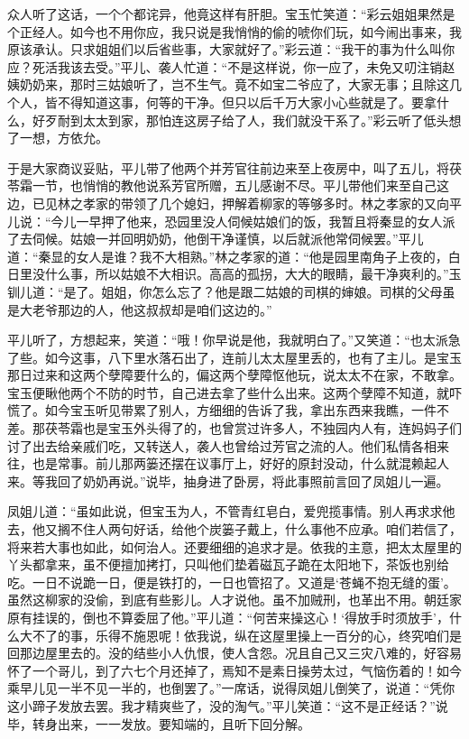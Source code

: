 \documentclass[12pt,oneside]{book}
\begin{document}
众人听了这话，一个个都诧异，他竟这样有肝胆。宝玉忙笑道：“彩云姐姐果然是个正经人。如今也不用你应，我只说是我悄悄的偷的唬你们玩，如今闹出事来，我原该承认。只求姐姐们以后省些事，大家就好了。”彩云道：“我干的事为什么叫你应？死活我该去受。”平儿、袭人忙道：“不是这样说，你一应了，未免又叨注销赵姨奶奶来，那时三姑娘听了，岂不生气。竟不如宝二爷应了，大家无事；且除这几个人，皆不得知道这事，何等的干净。但只以后千万大家小心些就是了。要拿什么，好歹耐到太太到家，那怕连这房子给了人，我们就没干系了。”彩云听了低头想了一想，方依允。

于是大家商议妥贴，平儿带了他两个并芳官往前边来至上夜房中，叫了五儿，将茯苓霜一节，也悄悄的教他说系芳官所赠，五儿感谢不尽。平儿带他们来至自己这边，已见林之孝家的带领了几个媳妇，押解着柳家的等够多时。林之孝家的又向平儿说：“今儿一早押了他来，恐园里没人伺候姑娘们的饭，我暂且将秦显的女人派了去伺候。姑娘一并回明奶奶，他倒干净谨慎，以后就派他常伺候罢。”平儿道：“秦显的女人是谁？我不大相熟。”林之孝家的道：“他是园里南角子上夜的，白日里没什么事，所以姑娘不大相识。高高的孤拐，大大的眼睛，最干净爽利的。”玉钏儿道：“是了。姐姐，你怎么忘了？他是跟二姑娘的司棋的婶娘。司棋的父母虽是大老爷那边的人，他这叔叔却是咱们这边的。”

平儿听了，方想起来，笑道：“哦！你早说是他，我就明白了。”又笑道：“也太派急了些。如今这事，八下里水落石出了，连前儿太太屋里丢的，也有了主儿。是宝玉那日过来和这两个孽障要什么的，偏这两个孽障怄他玩，说太太不在家，不敢拿。宝玉便瞅他两个不防的时节，自己进去拿了些什么出来。这两个孽障不知道，就吓慌了。如今宝玉听见带累了别人，方细细的告诉了我，拿出东西来我瞧，一件不差。那茯苓霜也是宝玉外头得了的，也曾赏过许多人，不独园内人有，连妈妈子们讨了出去给亲戚们吃，又转送人，袭人也曾给过芳官之流的人。他们私情各相来往，也是常事。前儿那两篓还摆在议事厅上，好好的原封没动，什么就混赖起人来。等我回了奶奶再说。”说毕，抽身进了卧房，将此事照前言回了凤姐儿一遍。

凤姐儿道：“虽如此说，但宝玉为人，不管青红皂白，爱兜揽事情。别人再求求他去，他又搁不住人两句好话，给他个炭篓子戴上，什么事他不应承。咱们若信了，将来若大事也如此，如何治人。还要细细的追求才是。依我的主意，把太太屋里的丫头都拿来，虽不便擅加拷打，只叫他们垫着磁瓦子跪在太阳地下，茶饭也别给吃。一日不说跪一日，便是铁打的，一日也管招了。又道是‘苍蝇不抱无缝的蛋’。虽然这柳家的没偷，到底有些影儿。人才说他。虽不加贼刑，也革出不用。朝廷家原有挂误的，倒也不算委屈了他。”平儿道：“何苦来操这心！‘得放手时须放手’，什么大不了的事，乐得不施恩呢！依我说，纵在这屋里操上一百分的心，终究咱们是回那边屋里去的。没的结些小人仇恨，使人含怨。况且自己又三灾八难的，好容易怀了一个哥儿，到了六七个月还掉了，焉知不是素日操劳太过，气恼伤着的！如今乘早儿见一半不见一半的，也倒罢了。”一席话，说得凤姐儿倒笑了，说道：“凭你这小蹄子发放去罢。我才精爽些了，没的淘气。”平儿笑道：“这不是正经话？”说毕，转身出来，一一发放。要知端的，且听下回分解。
\end{document}
